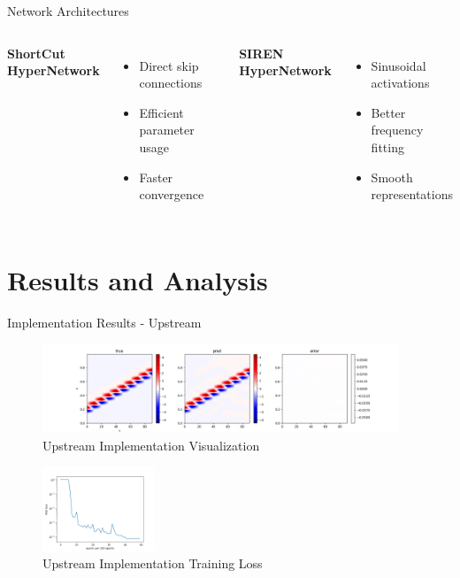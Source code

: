 \documentclass{beamer}
\begin{document}
\begin{frame}{Network Architectures}
    \begin{columns}
        \textbf{ShortCut HyperNetwork}
        \begin{itemize}
            \item Direct skip connections
            \item Efficient parameter usage
            \item Faster convergence
        \end{itemize}
        
        \textbf{SIREN HyperNetwork}
        \begin{itemize}
            \item Sinusoidal activations
            \item Better frequency fitting
            \item Smooth representations
        \end{itemize}
    \end{columns}
\end{frame}

\section{Results and Analysis}
\begin{frame}{Implementation Results - Upstream}
    \begin{figure}
        \includegraphics[width=0.95\textwidth]{upstream_vis.png}
        \caption{Upstream Implementation Visualization}
    \end{figure}
    \begin{figure}
        \includegraphics[width=0.3\textwidth]{upstream_loss.png}
        \caption{Upstream Implementation Training Loss}
    \end{figure}
\end{frame}
\end{document}
